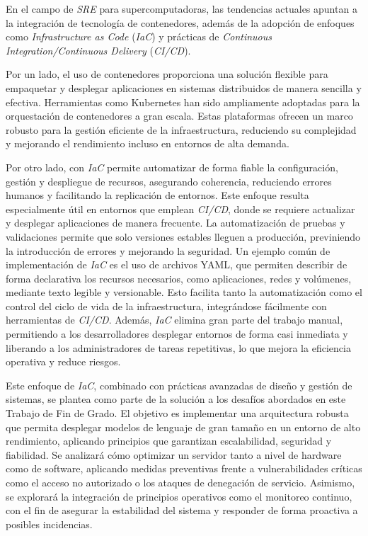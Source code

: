 En el campo de \textit{SRE} para supercomputadoras, las tendencias actuales apuntan a la integración de tecnología de contenedores, además de la adopción de enfoques como \textit{Infrastructure as Code} (\textit{IaC}) y prácticas de \textit{Continuous Integration/Continuous Delivery} (\textit{CI/CD}).

Por un lado, el uso de contenedores proporciona una solución flexible para empaquetar y desplegar aplicaciones en sistemas distribuidos de manera sencilla y efectiva. Herramientas como Kubernetes han sido ampliamente adoptadas para la orquestación de contenedores a gran escala. Estas plataformas ofrecen un marco robusto para la gestión eficiente de la infraestructura, reduciendo su complejidad y mejorando el rendimiento incluso en entornos de alta demanda.

Por otro lado, con \textit{IaC}  permite automatizar de forma fiable la configuración, gestión y despliegue de recursos, asegurando coherencia, reduciendo errores humanos y facilitando la replicación de entornos. Este enfoque resulta especialmente útil en entornos que emplean \textit{CI/CD}, donde se requiere actualizar y desplegar aplicaciones de manera frecuente. La automatización de pruebas y validaciones permite que solo versiones estables lleguen a producción, previniendo la introducción de errores y mejorando la seguridad. Un ejemplo común de implementación de \textit{IaC} es el uso de archivos YAML, que permiten describir de forma declarativa los recursos necesarios, como aplicaciones, redes y volúmenes, mediante texto legible y versionable. Esto facilita tanto la automatización como el control del ciclo de vida de la infraestructura, integrándose fácilmente con herramientas de \textit{CI/CD}. Además, \textit{IaC} elimina gran parte del trabajo manual, permitiendo a los desarrolladores desplegar entornos de forma casi inmediata y liberando a los administradores de tareas repetitivas, lo que mejora la eficiencia operativa y reduce riesgos.

Este enfoque de \textit{IaC}, combinado con prácticas avanzadas de diseño y gestión de sistemas, se plantea como parte de la solución a los desafíos abordados en este Trabajo de Fin de Grado. El objetivo es implementar una arquitectura robusta que permita desplegar modelos de lenguaje de gran tamaño en un entorno de alto rendimiento, aplicando principios que garantizan escalabilidad, seguridad y fiabilidad. Se analizará cómo optimizar un servidor tanto a nivel de hardware como de software, aplicando medidas preventivas frente a vulnerabilidades críticas como el acceso no autorizado o los ataques de denegación de servicio. Asimismo, se explorará la integración de principios operativos como el monitoreo continuo, con el fin de asegurar la estabilidad del sistema y responder de forma proactiva a posibles incidencias.

